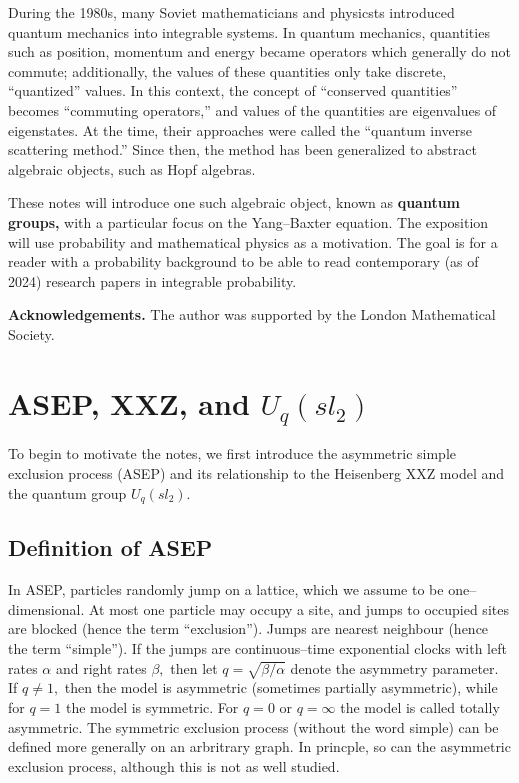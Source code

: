 \documentclass{ximera}
\begin{document}
During the 1980s, many Soviet mathematicians and physicsts introduced quantum mechanics into integrable
systems. In quantum mechanics, quantities such as position, momentum and energy became operators which 
generally do not commute; additionally, the values of these quantities only take discrete, ``quantized''
values. In this context, the concept of ``conserved quantities'' becomes ``commuting operators,'' and 
values of the quantities are eigenvalues of eigenstates. At the time, their approaches were called the
``quantum inverse scattering method.'' Since then, the method has been generalized to abstract 
algebraic objects, such as Hopf algebras. 

These notes will introduce one such algebraic object, known as \textbf{quantum groups,} with a particular
focus on the Yang--Baxter equation. The exposition will use probability and mathematical physics as a
motivation. The goal is for a reader with a probability background to be able to read contemporary (as of
2024) research papers in integrable probability. 

\textbf{Acknowledgements.} The author was supported by the London Mathematical Society. 

\section{ASEP, XXZ, and $U_q(sl_2)$}

To begin to motivate the notes, we first introduce the asymmetric simple exclusion process (ASEP) and its relationship to 
the Heisenberg XXZ model and the quantum group $U_q(sl_2).$ 

\subsection{Definition of ASEP}
In ASEP, particles randomly jump on a lattice, which we assume to be
one--dimensional. At most one particle may occupy a site, and jumps to occupied sites are blocked (hence the term ``exclusion'').
Jumps are nearest neighbour (hence the term ``simple''). If the jumps are continuous--time exponential 
clocks with left rates $\alpha$ and right rates $\beta,$ then let $q=\sqrt{\beta/\alpha}$ denote the 
asymmetry parameter. If $q\neq 1,$ then the model is asymmetric (sometimes partially asymmetric), 
while for $q=1$ the model is symmetric. For $q=0$ or $q=\infty$ the model is called totally asymmetric.
The symmetric exclusion process (without the word simple) can be defined more generally on an arbritrary graph. In princple, so can 
the asymmetric exclusion process, although this is not as well studied.  
\end{document}
